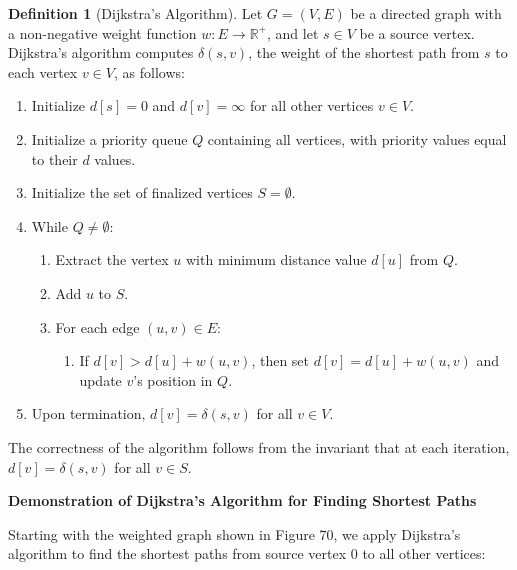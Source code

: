 \documentclass{article}
\theoremstyle{definition}
\newtheorem{definition}{Definition}
\begin{document}
\begin{definition}[Dijkstra's Algorithm]
Let $G = (V, E)$ be a directed graph with a non-negative weight function $w: E \rightarrow \mathbb{R}^+$, and let $s \in V$ be a source vertex. Dijkstra's algorithm computes $\delta(s, v)$, the weight of the shortest path from $s$ to each vertex $v \in V$, as follows:

\begin{enumerate}
\item Initialize $d[s] = 0$ and $d[v] = \infty$ for all other vertices $v \in V$.
\item Initialize a priority queue $Q$ containing all vertices, with priority values equal to their $d$ values.
\item Initialize the set of finalized vertices $S = \emptyset$.
\item While $Q \neq \emptyset$:
  \begin{enumerate}
    \item Extract the vertex $u$ with minimum distance value $d[u]$ from $Q$.
    \item Add $u$ to $S$.
    \item For each edge $(u, v) \in E$:
      \begin{enumerate}
        \item If $d[v] > d[u] + w(u, v)$, then set $d[v] = d[u] + w(u, v)$ and update $v$'s position in $Q$.
      \end{enumerate}
  \end{enumerate}
\item Upon termination, $d[v] = \delta(s, v)$ for all $v \in V$.
\end{enumerate}

\noindent The correctness of the algorithm follows from the invariant that at each iteration, $d[v] = \delta(s, v)$ for all $v \in S$.
\end{definition}

\noindent\textbf{Demonstration of Dijkstra's Algorithm for Finding Shortest Paths}

Starting with the weighted graph shown in Figure 70, we apply Dijkstra's algorithm to find the shortest paths from source vertex 0 to all other vertices:
\end{document}

